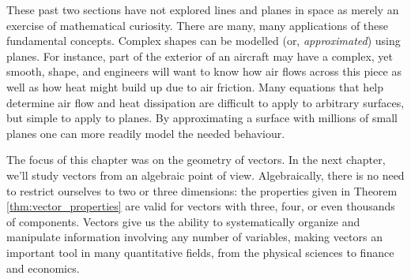 These past two sections have not explored lines and planes in space as merely an exercise of mathematical curiosity. There are many, many applications of these fundamental concepts. Complex shapes can be modelled (or, \textit{approximated}) using planes. For instance, part of the exterior of an aircraft may have a complex, yet smooth, shape, and engineers will want to know how air flows across this piece as well as how heat might build up due to air friction. Many equations that help determine air flow and heat dissipation are difficult to apply to arbitrary surfaces, but simple to apply to planes. By approximating a surface with millions of small planes one can more readily model the needed behaviour.

The focus of this chapter was on the geometry of vectors. In the next chapter, we'll study vectors from an algebraic point of view. Algebraically, there is no need to restrict ourselves to two or three dimensions: the properties given in Theorem \ref{thm:vector_properties} are valid for vectors with three, four, or even thousands of components. Vectors give us the ability to systematically organize and manipulate information involving any number of variables, making vectors an important tool in many quantitative fields, from the physical sciences to finance and economics.

